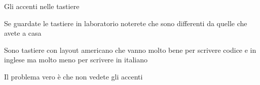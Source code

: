 \begin{frame}{Gli accenti nelle tastiere}

Se guardate le tastiere in laboratorio noterete che sono differenti da quelle
che avete a casa

\vfill

Sono tastiere con layout americano che vanno molto bene per scrivere codice
e in inglese ma molto meno per scrivere in italiano

\vfill

Il problema vero è che non vedete gli accenti

\end{frame}